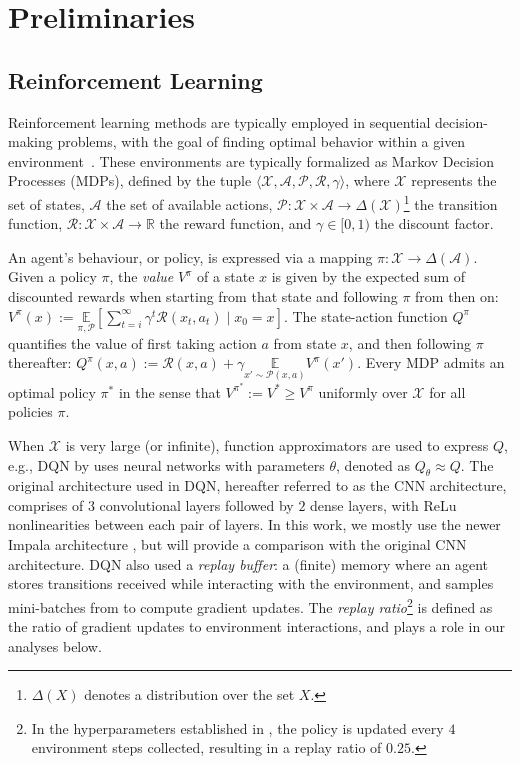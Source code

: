 \documentclass{article}
\theoremstyle{plain}
\theoremstyle{definition}
\theoremstyle{remark}
\newcommand{\mdp}[1]{\mathcal{#1}}
\begin{document}
\section{Preliminaries}
\label{sec:background}

\subsection{Reinforcement Learning}
Reinforcement learning methods are typically employed in sequential decision-making problems, with the goal of finding optimal behavior within a given environment~\citep{sutton98rl}. These environments are typically formalized as Markov Decision Processes (MDPs), defined by the tuple $\langle \mdp{X}, \mdp{A}, \mdp{P}, \mdp{R}, \gamma \rangle$, where $\mdp{X}$ represents the set of states, $\mdp{A}$ the set of available actions, $\mdp{P}:\mdp{X}\times\mdp{A}\to \Delta(\mdp{X})$\footnote{$\Delta(X)$ denotes a distribution over the set $X$.} the transition function, $\mdp{R}:\mdp{X}\times\mdp{A}\to\mathbb{R}$ the reward function, and $\gamma\in [0, 1)$ the discount factor.

An agent's behaviour, or policy, is expressed via a mapping $\pi:\mdp{X}\to\Delta(\mdp{A})$. Given a policy $\pi$, the {\em value} $V^{\pi}$ of a state $x$ is given by the expected sum of discounted rewards when starting from that state and following $\pi$ from then on:\\
$ V^\pi(x) := \underset{\pi, \mdp{P}}{\mathbb{E}}\left[\sum_{t=i}^{\infty} \gamma^t \mdp{R}\left(x_t, a_t \right) \mid x_0 = x \right]. $ The state-action function $Q^{\pi}$ quantifies the value of first taking action $a$ from state $x$, and then following $\pi$ thereafter: $Q^{\pi}(x, a) := \mdp{R}(x, a) + \gamma\underset{x'\sim\mdp{P}(x, a)}{\mathbb{E}}V^{\pi}(x')$. Every MDP admits an optimal policy $\pi^*$ in the sense that $V^{\pi^*} := V^* \geq V^{\pi}$ uniformly over $\mdp{X}$ for all policies $\pi$.


When $\mdp{X}$ is very large (or infinite), function approximators are used to express $Q$, e.g., DQN by \citet{mnih2015humanlevel} uses neural networks with parameters $\theta$, denoted as $Q_{\theta}\approx Q$. The original architecture used in DQN, hereafter referred to as the CNN architecture, comprises of 3 convolutional layers followed by $2$ dense layers, with ReLu nonlinearities \citep{fukushima1969visual} between each pair of layers. In this work, we mostly use the newer Impala architecture \citep{espeholt2018impala}, but will provide a comparison with the original CNN architecture. DQN also used a {\em replay buffer}: a (finite) memory where an agent stores transitions received while interacting with the environment, and samples mini-batches from to compute gradient updates. The {\em replay ratio}\footnote{\label{note1} In the hyperparameters established in \cite{mnih2015humanlevel}, the policy is updated every $4$ environment steps collected, resulting in a replay ratio of $0.25$.} is defined as the ratio of gradient updates to environment interactions, and plays a role in our analyses below. 
\end{document}
